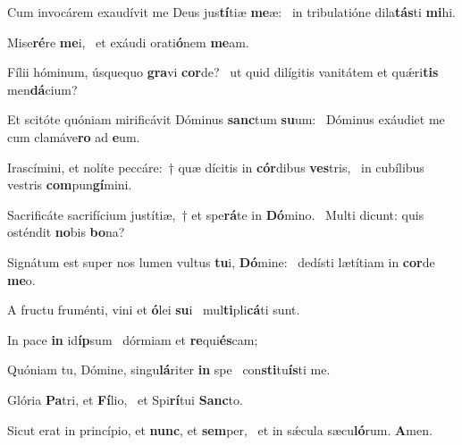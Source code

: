 \item Cum invocárem exaudívit me Deus jus\textbf{tí}tiæ \textbf{me}æ:~\psstar{} in tribulatióne dila\textbf{tás}ti \textbf{mi}hi.
\item Mise\textbf{ré}re \textbf{me}i,~\psstar{} et exáudi orati\textbf{ó}nem \textbf{me}am.
\item Fílii hóminum, úsquequo \textbf{gra}vi \textbf{cor}de?~\psstar{} ut quid dilígitis vanitátem et quǽri\textbf{tis} men\textbf{dá}cium?
\item Et scitóte quóniam mirificávit Dóminus \textbf{sanc}tum \textbf{su}um:~\psstar{} Dóminus exáudiet me cum clamáve\textbf{ro} ad \textbf{e}um.
\item Irascímini, et nolíte peccáre:~† quæ dícitis in \textbf{cór}dibus \textbf{ves}tris,~\psstar{} in cubílibus vestris \textbf{com}pun\textbf{gí}mini.
\item Sacrificáte sacrifícium justítiæ,~† et spe\textbf{rá}te in \textbf{Dó}mino.~\psstar{} Multi dicunt: quis osténdit \textbf{no}bis \textbf{bo}na?
\item Signátum est super nos lumen vultus \textbf{tu}i, \textbf{Dó}mine:~\psstar{} dedísti lætítiam in \textbf{cor}de \textbf{me}o.
\item A fructu fruménti, vini et \textbf{ó}lei \textbf{su}i~\psstar{} mul\textbf{ti}pli\textbf{cá}ti sunt.
\item In pace \textbf{in} id\textbf{íp}sum~\psstar{} dórmiam et \textbf{re}qui\textbf{és}cam;
\item Quóniam tu, Dómine, singu\textbf{lá}riter \textbf{in} spe~\psstar{} con\textbf{sti}tu\textbf{ís}ti me.
\item Glória \textbf{Pa}tri, et \textbf{Fí}lio,~\psstar{} et Spi\textbf{rí}tui \textbf{Sanc}to.
\item Sicut erat in princípio, et \textbf{nunc}, et \textbf{sem}per,~\psstar{} et in sǽcula sæcu\textbf{ló}rum. \textbf{A}men.
